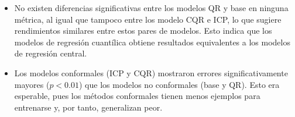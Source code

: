 \begin{itemize}

    \item No existen diferencias significativas entre los modelos QR y base en ninguna métrica, al igual que tampoco entre los modelo CQR e ICP, lo que sugiere rendimientos similares entre estos pares de modelos. Esto indica que los modelos de regresión cuantílica obtiene resultados equivalentes a los modelos de regresión central. 

    \item Los modelos conformales (ICP y CQR) mostraron errores significativamente mayores ($p<0.01$) que los modelos no conformales (base y QR). Esto era esperable, pues los métodos conformales tienen menos ejemplos para entrenarse y, por tanto, generalizan peor. 

\end{itemize}

